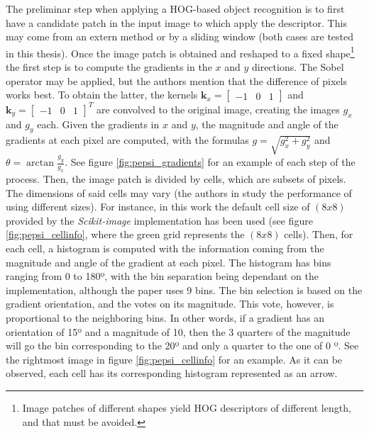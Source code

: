 \documentclass[../main.tex]{subfiles}
\begin{document}
The preliminar step when applying a HOG-based object recognition is to first have a candidate patch in the input image to which apply the descriptor. This may come from an extern method or by a sliding window (both cases are tested in this thesis). Once the image patch is obtained and reshaped to a fixed shape\footnote{Image patches of different shapes yield HOG descriptors of different length, and that must be avoided.} the first step is to compute the gradients in the $x$ and $y$ directions. The Sobel operator \cite{Sobel_operator_history} may be applied, but the authors mention that the difference of pixels works best. To obtain the latter, the kernels $\boldsymbol{k}_{x} = \begin{bmatrix} -1 & 0 & 1 \end{bmatrix}$ and $\boldsymbol{k}_{y} = \begin{bmatrix} -1 & 0 & 1 \end{bmatrix}^{T}$ are convolved to the original image, creating the images $g_{x}$ and $g_{y}$ each. Given the gradients in $x$ and $y$, the magnitude and angle of the gradients at each pixel are computed, with the formulas $g = \sqrt{g_{x}^{2} + g_{y}^{2}}$ and $\theta = \arctan \frac{g_{y}}{g_{x}}$. See figure \ref{fig:pepsi_gradients} for an example of each step of the process. Then, the image patch is divided by cells, which are subsets of pixels. The dimensions of said cells may vary (the authors in \cite{hog_paper} study the performance of using different sizes). For instance, in this work the default cell size of $\left(8x8\right)$ provided by the \emph{Scikit-image} implementation has been used (see figure \ref{fig:pepsi_cellinfo}, where the green grid represents the $\left(8x8\right)$ cells). Then, for each cell, a histogram is computed with the information coming from the magnitude and angle of the gradient at each pixel. The histogram has bins ranging from 0 to 180º, with the bin separation being dependant on the implementation, although the paper uses 9 bins. The bin selection is based on the gradient orientation, and the votes on its magnitude. This vote, however, is proportional to the neighboring bins. In other words, if a gradient has an orientation of 15º and a magnitude of 10, then the 3 quarters of the magnitude will go the bin corresponding to the 20º and only a quarter to the one of 0 º. See the rightmost image in figure \ref{fig:pepsi_cellinfo} for an example. As it can be observed, each cell has its corresponding histogram represented as an arrow.
\end{document}
